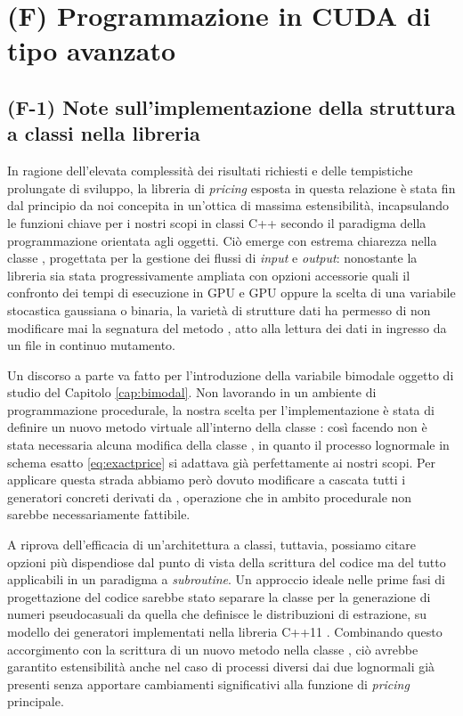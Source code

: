 \chapter{(F) Programmazione in CUDA di tipo avanzato} \label{cap:cudacpp}

\section{(F-1) Note sull'implementazione della struttura a classi nella libreria}
In ragione dell'elevata complessità dei risultati richiesti e delle tempistiche prolungate di sviluppo, la libreria di \textit{pricing} esposta in questa relazione è stata fin dal principio da noi concepita in un'ottica di massima estensibilità, incapsulando le funzioni chiave per i nostri scopi in classi C++ secondo il paradigma della programmazione orientata agli oggetti. Ciò emerge con estrema chiarezza nella classe , progettata per la gestione dei flussi di \textit{input} e \textit{output}: nonostante la libreria sia stata progressivamente ampliata con opzioni accessorie quali il confronto dei tempi di esecuzione in GPU e GPU oppure la scelta di una variabile stocastica gaussiana o binaria, la varietà di strutture dati ha permesso di non modificare mai la segnatura del metodo , atto alla lettura dei dati in ingresso da un file  in continuo mutamento.

Un discorso a parte va fatto per l'introduzione della variabile bimodale oggetto di studio del Capitolo \ref{cap:bimodal}. Non lavorando in un ambiente di programmazione procedurale, la nostra scelta per l'implementazione è stata di definire un nuovo metodo virtuale  all'interno della classe : così facendo non è stata necessaria alcuna modifica della classe , in quanto il processo lognormale in schema esatto \eqref{eq:exactprice} si adattava già perfettamente ai nostri scopi. Per applicare questa strada abbiamo però dovuto modificare a cascata tutti i generatori concreti derivati da , operazione che in ambito procedurale non sarebbe necessariamente fattibile.

A riprova dell'efficacia di un'architettura a classi, tuttavia, possiamo citare opzioni più dispendiose dal punto di vista della scrittura del codice ma del tutto applicabili in un paradigma a \textit{subroutine}. Un approccio ideale nelle prime fasi di progettazione del codice sarebbe stato separare la classe per la generazione di numeri pseudocasuali da quella che definisce le distribuzioni di estrazione, su modello dei generatori implementati nella libreria C++11 . Combinando questo accorgimento con la scrittura di un nuovo metodo  nella classe , ciò avrebbe garantito estensibilità anche nel caso di processi diversi dai due lognormali già presenti senza apportare cambiamenti significativi alla funzione di \textit{pricing} principale.

